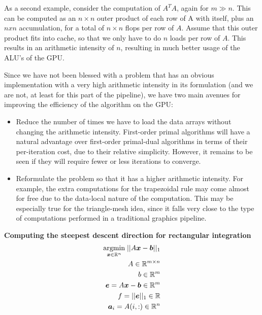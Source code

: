 \documentclass[12pt,journal,draftcls,letterpaper,twocolumn]{IEEEtran}
\begin{document}
As a second example, consider the computation of $A^T A$, again for $m \gg n$.
This can be computed as an $n \times n$ outer product of each row of A with
itself, plus an $n x n$ accumulation, for a total of $n \times n$ flops per row
of $A$.  Assume that this outer product fits into cache, so that we only have
to do $n$ loads per row of $A$.  This results in an arithmetic intensity of
$n$, resulting in much better usage of the ALU's of the GPU.

Since we have not been blessed with a problem that has an obvious
implementation with a very high arithmetic intensity in its formulation (and we
are not, at least for this part of the pipeline), we have two main avenues for
improving the efficiency of the algorithm on the GPU:

\begin{itemize}
\item Reduce the number of times we have to load the data arrays without
changing the arithmetic intensity.  First-order primal algorithms will have a
natural advantage over first-order primal-dual algorithms in terms of their
per-iteration cost, due to their relative simplicity.  However, it remains to
be seen if they will require fewer or less iterations to converge.

\item Reformulate the problem so that it has a higher arithmetic intensity.
For example, the extra computations for the trapezoidal rule may come almost
for free due to the data-local nature of the computation.  This may be
especially true for the triangle-mesh idea, since it falls very close to the
type of computations performed in a traditional graphics pipeline.

\end{itemize}

{\bf Computing the steepest descent direction for rectangular integration }
\begin{eqnarray}
{\hbox{$\underset{{\boldsymbol{x}}\in \mathbb R^n}{\mbox{argmin}}\;$}} ||A {\boldsymbol{x}} - \boldsymbol{b}||_1 \\
A \in \mathbb R^{m \times n}\\
b \in \mathbb R^m \\
\boldsymbol{e} = A {\boldsymbol{x}} - \boldsymbol{b} \in \mathbb R^m\\
f = ||\boldsymbol{e}||_1 \in \mathbb R \\
\boldsymbol{a}_i = A(i,:) \in \mathbb R^{n}\\
\end{eqnarray}
\end{document}
